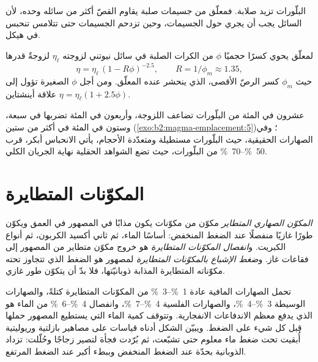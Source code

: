 البلّورات تزيد  صلابة. فمعلّق من جسيمات صلبة يقاوم
القصّ أكثر من سائله وحده، لأن السائل يجب أن يجري حول
الجسيمات، وحين تزدحم الجسيمات حتى تتلامس تنحبس في
هيكل.

\begin{proposition}\label{prop:b2:magma-emplacement:roscoe}
لمعلّق يحوي كسرًا حجميًا $\phi$ من الكرات الصلبة في سائل نيوتني
لزوجته $\eta_{\ell}$ لزوجةٌ قدرها
\[
\eta = \eta_{\ell}\,(1 - R\phi)^{-2.5}, \qquad R = 1/\phi_m \approx 1.35,
\]
حيث $\phi_m$ كسر الرصّ الأقصى، الذي ينحشر عنده المعلّق. ومن أجل
$\phi$ الصغيرة تؤول إلى علاقة أينشتاين $\eta = \eta_{\ell}(1 + 2.5\phi)$.
\end{proposition}
\admitted

عشرون في المئة من البلّورات تضاعف اللزوجة، وأربعون في المئة تضربها في
سبعة، وستون في المئة في أكثر من ستين (\cref{exo:b2:magma-emplacement:5})؛ وفي الصهارات الحقيقية، حيث
البلّورات مستطيلة ومتعدّدة الأحجام، يأتي الانحباس أبكر، قرب
\qtyrange{50}{70}{\percent} من البلّورات، حيث تضع الشواهد الحقلية
نهاية الجريان الكلي.

\section{المكوّنات المتطايرة}

\begin{definition}\label{def:b2:magma-emplacement:volatiles}
\emph{المكوّن الصهاري المتطاير} مكوّن من مكوّنات 
يكون مذابًا في المصهور في العمق ويكوّن طورًا غازيًا منفصلًا عند الضغط
المنخفض: أساسًا الماء، ثم ثاني أكسيد الكربون، ثم أنواع الكبريت. و\emph{انفصال
المكوّنات المتطايرة} هو خروج مكوّن متطاير من
المصهور إلى فقاعات غاز. و\emph{ضغط الإشباع بالمكوّنات
المتطايرة} لمصهور هو الضغط الذي تتجاوز تحته
مكوّناته المتطايرة المذابة ذوبانيّتها، فلا بدّ أن يتكوّن طور غازي.
\end{definition}

تحمل الصهارات المافية عادة \qtyrange{1}{3}{\percent} من المكوّنات المتطايرة كتلةً،
والصهارات الوسيطة \qtyrange{3}{4}{\percent}، والصهارات الفلسية
\qtyrange{4}{7}{\percent}، وانفصال \qtyrange{4}{6}{\percent} من
الماء هو الذي يدفع معظم الاندفاعات الانفجارية. وتتوقف كمية الماء التي يستطيع المصهور حملها
قبل كل شيء على الضغط. ويبيّن الشكل أدناه قياسات على مصاهير بازلتية
وريوليتية أُبقيت تحت ضغط ماء معلوم حتى تشبّعت، ثم بُرّدت فجأة
لتصير زجاجًا وحُلّلت: تزداد الذوبانية بحدّة عند الضغط المنخفض وببطء
أكبر عند الضغط المرتفع.

